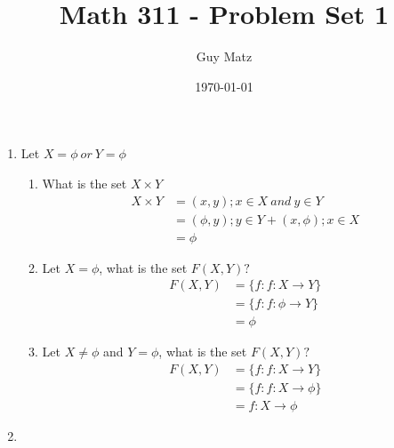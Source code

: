 \documentclass[11pt]{article}
\title{\textbf{Math 311 - Problem Set 1}}
\author{Guy Matz}
\date{\today}
\begin{document}
\maketitle

\newpage

\begin{enumerate}  %
\item Let $X = \phi \ or \ Y = \phi$

\begin{enumerate} %
\item What is the set $X \times Y$
\begin{align*}
    X \times Y &= {(x,y) ; x \in X \ and\ y\in Y}
\\             &= {(\phi, y) ; y \in Y } + {(x, \phi) ; x \in X }
\\             &= \phi
\end{align*}
\item Let $X = \phi$, what is the set $F(X,Y)?$
\begin{align*}
    F(X,Y) &= \{f: f:X \to Y\}
\\         &= \{f: f:\phi \to Y\}
\\         &= \phi
\end{align*}

\item Let $X \neq \phi$ and $Y = \phi$, what is the set $F(X,Y)?$
\begin{align*}
    F(X,Y) &= \{f: f:X \to Y\}
\\         &= \{f: f:X \to \phi\}
\\         &= f:X \to \phi
\end{align*}
  
\end{enumerate} %

\newpage

\item


\end{enumerate}
\end{document}
